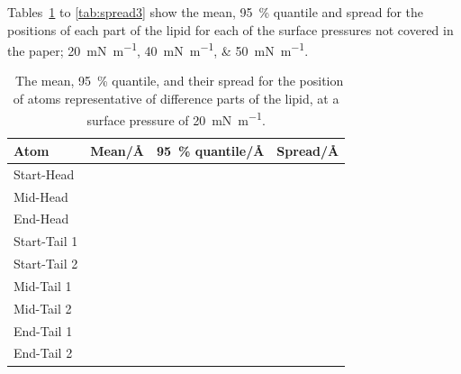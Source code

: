 \documentclass[amsmath,amssymb,superscriptaddress]{revtex4-1}
\begin{document}
Tables~\ref{tab:spread1} to \ref{tab:spread3} show the mean, \SI{95}{\percent} quantile and spread for the positions of each part of the lipid for each of the surface pressures not covered in the paper; \SIlist{20;40;50}{\milli\newton\per\meter}.
%
\begin{table}[h]
\small
  \caption{\ The mean, \SI{95}{\percent} quantile, and their spread for the position of atoms representative of difference parts of the lipid, at a surface pressure of \SI{20}{\milli\newton\per\meter}.}
  \label{tab:spread1}
  \begin{tabular*}{0.48\textwidth}{@{\extracolsep{\fill}}llll}
    \hline
    Atom & Mean/\si{\angstrom} & \SI{95}{\percent} quantile/\si{\angstrom} & Spread/\si{\angstrom} \\
    \hline
    Start-Head &  &  &  \\
    Mid-Head &  &  &  \\
    End-Head &  &  &  \\
    \hline
    Start-Tail 1 &  &  &  \\
    Start-Tail 2 &  &  &  \\
    Mid-Tail 1 &  &  &  \\
    Mid-Tail 2 &  &  &  \\
    End-Tail 1 &  &  &  \\
    End-Tail 2 &  &  &  \\
    \hline
  \end{tabular*}
\end{table}
\end{document}
